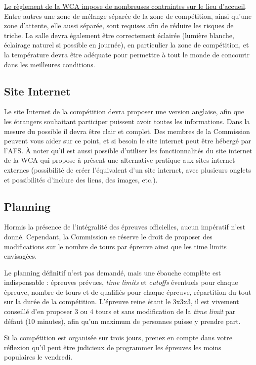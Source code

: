 \documentclass[a4paper,12pt]{scrartcl}
\begin{document}
\href{https://www.worldcubeassociation.org/regulations/translations/french/#article-7-environment}{Le règlement de la WCA impose de nombreuses contraintes sur le lieu d'accueil}.
Entre autres une zone de mélange séparée de la zone de compétition, ainsi qu'une zone d'attente, elle aussi séparée, sont requises afin de réduire les risques de triche.
La salle devra également être correctement éclairée (lumière blanche, éclairage naturel si possible en journée), en particulier la zone de compétition, et la température devra être adéquate pour permettre à tout le monde de concourir dans les meilleures conditions.


\subsection*{Site Internet}

Le site Internet de la compétition devra proposer une version anglaise, afin que les étrangers souhaitant participer puissent avoir toutes les informations.
Dans la mesure du possible il devra être clair et complet. Des membres de la Commission peuvent vous aider sur ce point, et si besoin le site internet peut être hébergé par l'AFS. À noter qu'il est aussi possible d'utiliser les fonctionnalités du site internet de la WCA qui propose à présent une alternative pratique aux sites internet externes (possibilité de créer l'équivalent d'un site internet, avec plusieurs onglets et possibilités d'inclure des liens, des images, etc.).


\subsection*{Planning}

Hormis la présence de l'intégralité des épreuves officielles, aucun impératif n'est donné. Cependant, la Commission se réserve le droit de proposer des modifications sur le nombre de tours par épreuve ainsi que les time limits envisagées.

Le planning définitif n'est pas demandé, mais une ébauche complète est indispensable : épreuves prévues, \emph{time limits} et \emph{cutoffs} éventuels pour chaque épreuve, nombre de tours et de qualifiés pour chaque épreuve, répartition du tout sur la durée de la compétition. L'épreuve reine étant le 3x3x3, il est vivement conseillé d'en proposer 3 ou 4 tours et sans modification de la \emph{time limit} par défaut (10 minutes), afin qu'un maximum de personnes puisse y prendre part.

Si la compétition est organisée sur trois jours, prenez en compte dans votre réflexion qu'il peut être judicieux de programmer les épreuves les moins populaires le vendredi.
\end{document}
